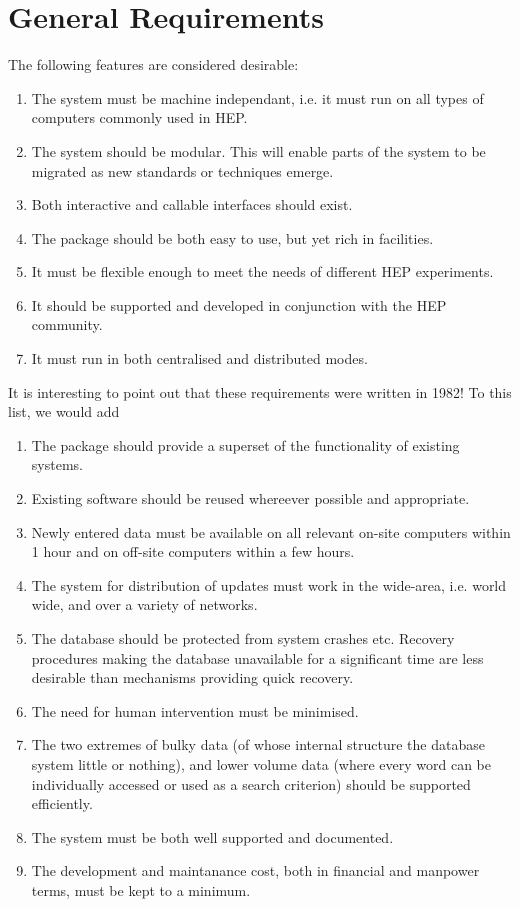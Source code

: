 \section{General Requirements}
\par
The following features are considered desirable:
\begin{enumerate}
\item
The system must be machine independant, i.e. it must run on all
types of computers commonly used in HEP.
\item
The system should be modular. This will enable parts of the system
to be migrated as new standards or techniques emerge.
\item
Both interactive and callable interfaces should exist.
\item
The package should be both easy to use, but yet rich in facilities.
\item
It must be flexible enough to meet the needs of different HEP experiments.
\item
It should be supported and developed in conjunction with the HEP community.
\item
It must run in both centralised and distributed modes.
\end{enumerate}
\par
It is interesting to point out that these requirements were written
in 1982! To this list, we would add
\begin{enumerate}
\item
The package should provide a superset of the functionality of existing systems.
\item
Existing software
should be reused whereever possible and appropriate.
\item
Newly entered data must be available on all relevant on-site
computers within 1 hour and on off-site computers within a few
hours.
\item
The system for distribution of updates must work in the wide-area,
i.e. world wide, and over a variety of networks.
\item
The database should be protected from system crashes etc.
Recovery procedures making the database unavailable for a significant
time are less desirable than mechanisms providing quick recovery.
\item
The need for human intervention must be minimised.
\item
The two extremes of bulky data (of whose internal structure the database system
little or nothing), and lower volume data (where every word can be individually
accessed or used as a search criterion) should be supported efficiently.
\item
The system must be both well supported and documented.
\item
The development and maintanance cost, both in financial and manpower
terms, must be kept to a minimum.
\end{enumerate}

